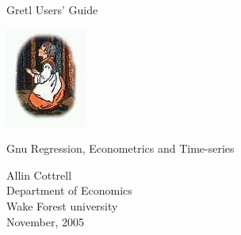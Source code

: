 \documentclass{report}
\begin{document}
\VerbatimFootnotes

\setlength{\parindent}{0pt}
\setlength{\parskip}{1ex}


\newcommand{\gtitle}[1]{\vspace*{1in}
   {\Huge \sffamily #1}\par
   \vspace{.5in}
  \includegraphics{figures/gretl-logo} 
}

\newcommand{\gsubtitle}[1]{%
   {\Large \sffamily #1}
   \vspace{.5in}
}

\thispagestyle{empty}

\begin{center}

\gtitle{Gretl Users' Guide}

\gsubtitle{Gnu Regression, Econometrics and Time-series}

{\large \sffamily 
Allin Cottrell\\
Department of Economics\\
Wake Forest university\\
\vspace{20pt}
November, 2005}

\end{center}
\clearpage


\tableofcontents

















\appendix



\end{document}
